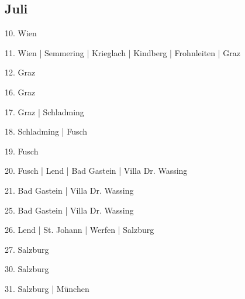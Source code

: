 \documentclass[twoside=false,titlepage=false,open=any, parskip=never, fontsize=10pt, headings=small, chapterprefix=false, appendixprefix=false, DIV=15]{scrbook}
\begin{document}
\begin{multicols}{3}
            \section*{Juli}
            10. Wien\par
            11. Wien | Semmering | Krieglach | Kindberg | Frohnleiten | Graz\par
            12. Graz\par
            16. Graz\par
            17. Graz | Schladming\par
            18. Schladming | Fusch\par
            19. Fusch\par
            20. Fusch | Lend | Bad Gastein | Villa Dr. Wassing\par
            21. Bad Gastein | Villa Dr. Wassing\par
            25. Bad Gastein | Villa Dr. Wassing\par
            26. Lend | St. Johann | Werfen | Salzburg\par
            27. Salzburg\par
            30. Salzburg\par
            31. Salzburg | München\par

\end{multicols}
\end{document}
